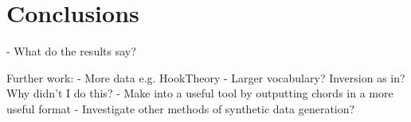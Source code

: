
\chapter{Conclusions}

- What do the results say?

Further work:
- More data e.g. HookTheory
- Larger vocabulary? Inversion as in? Why didn't I do this?
- Make into a useful tool by outputting chords in a more useful format
- Investigate other methods of synthetic data generation?
